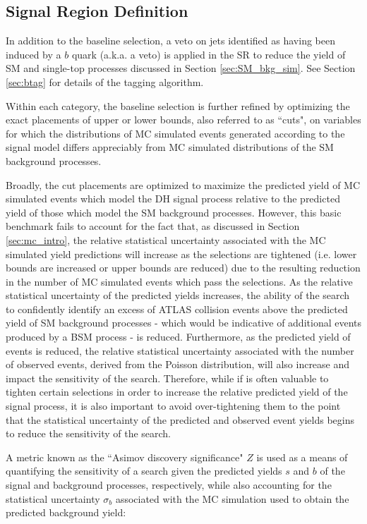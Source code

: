 \subsection{Signal Region Definition}
\label{sec:sr_selection}

In addition to the baseline selection, a veto on jets identified as having been induced by a \(b\) quark (a.k.a. a \bjet veto) is applied in the SR to reduce the yield of SM \ttbar and single-top processes discussed in Section \ref{sec:SM_bkg_sim}. See Section \ref{sec:btag} for details of the \bjet tagging algorithm. 


Within each category, the baseline selection is further refined by optimizing the exact placements of upper or lower bounds, also referred to as ``cuts", on variables for which the distributions of MC simulated events generated according to the signal model differs appreciably from MC simulated distributions of the SM background processes.

Broadly, the cut placements are optimized to maximize the predicted yield of MC simulated events which model the DH signal process relative to the predicted yield of those which model the SM background processes. However, this basic benchmark fails to account for the fact that, as discussed in Section \ref{sec:mc_intro}, the relative statistical uncertainty associated with the MC simulated yield predictions will increase as the selections are tightened (i.e. lower bounds are increased or upper bounds are reduced) due to the resulting reduction in the number of MC simulated events which pass the selections. As the relative statistical uncertainty of the predicted yields increases, the ability of the search to confidently identify an excess of ATLAS collision events above the predicted yield of SM background processes - which would be indicative of additional events produced by a BSM process - is reduced. Furthermore, as the predicted yield of events is reduced, the relative statistical uncertainty associated with the number of observed events, derived from the Poisson distribution, will also increase and impact the sensitivity of the search. Therefore, while if is often valuable to tighten certain selections in order to increase the relative predicted yield of the signal process, it is also important to avoid over-tightening them to the point that the statistical uncertainty of the predicted and observed event yields begins to reduce the sensitivity of the search. 

A metric known as the ``Asimov discovery significance" \cite{Buttinger:2643488} \(Z\) is used as a means of quantifying the sensitivity of a search given the predicted yields \(s\) and \(b\) of the signal and background processes, respectively, while also accounting for the statistical uncertainty \(\sigma_b\) associated with the MC simulation used to obtain the predicted background yield:

